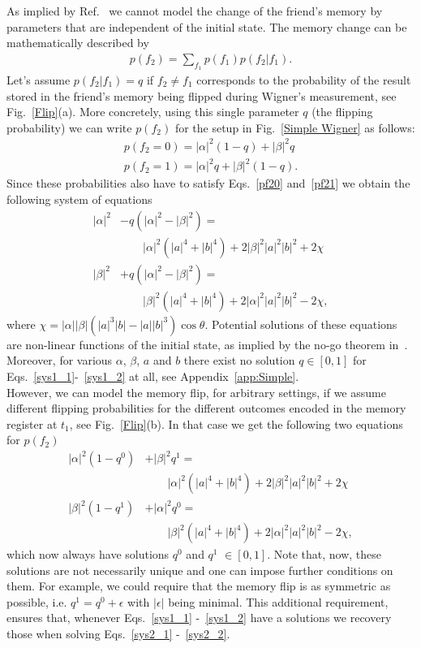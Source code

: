 \documentclass[a4paper,twocolumn,11pt,accepted=2017-05-09,dvipsnames]{quantumarticle}
\numberwithin{equation}{section}
\begin{document}
As implied by Ref.~\cite{allard2020no} we cannot model the change of the friend's memory by parameters that are independent of the initial state. The memory change can be mathematically described by
\begin{align}
\label{p2_0}
p(f_2)= \sum_{f_1}p(f_1)p(f_2|f_1).
\end{align}
Let's assume $p(f_2|f_1)=q$ if $f_2\neq f_1$ corresponds to the probability of the result stored in the friend's memory being flipped during Wigner's measurement, see Fig.~\ref{Flip}(a). More concretely, using this single parameter $q$ (the flipping probability) we can write $p(f_2)$ for the setup in Fig.~\ref{Simple Wigner} as follows:
\begin{align}
\label{p2_0}
p(f_2=0)= |\alpha |^2 (1-q)+|\beta |^2q \\
\label{p2_1}
p(f_2=1)=|\alpha |^2 q+|\beta |^2 (1-q).
\end{align}
Since these probabilities also have to satisfy Eqs.~\eqref{pf20} and~\eqref{pf21} we obtain the following system of equations
\begin{align}
\label{sys1_1}
|\alpha |^2 &-q(|\alpha |^2-|\beta |^2)=\\ 
& \qquad |\alpha|^2 (|a|^4+|b|^4)+2 |\beta|^2|a|^2|b|^2 +2\chi \nonumber \\
\label{sys1_2}
|\beta |^2 &+q(|\alpha |^2-|\beta |^2)= \\
& \qquad |\beta|^2 (|a|^4+|b|^4)+2 |\alpha|^2|a|^2|b|^2-2\chi, \nonumber
\end{align}
where $\chi=|\alpha| |\beta| (|a|^3|b| - |a||b|^3)\cos{\theta}$. Potential solutions of these equations are non-linear functions of the initial state, as implied by the no-go theorem in~\cite{allard2020no}. Moreover, for various $\alpha$, $\beta$, $a$ and $b$ there exist no solution $q\in [0,1]$ for  Eqs.~\eqref{sys1_1}-~\eqref{sys1_2} at all, see Appendix~\ref{app:Simple}. \\

However, we can model the memory flip, for arbitrary settings, if we assume different flipping probabilities for the different outcomes encoded in the memory register at $t_1$, see Fig.~\ref{Flip}(b). In that case we get the following two equations for $p(f_2)$
\begin{align}
\label{sys2_1}
|\alpha |^2 (1-q^0)&+|\beta |^2q^1=\\ 
& \qquad |\alpha|^2 (|a|^4+|b|^4)+2 |\beta|^2|a|^2|b|^2 +2\chi \nonumber \\
\label{sys2_2}
|\beta |^2 (1-q^1) &+|\alpha |^2q^0= \\
& \qquad |\beta|^2 (|a|^4+|b|^4)+2 |\alpha|^2|a|^2|b|^2-2\chi, \nonumber
\end{align}
which now always have solutions $q^0$ and $q^1$ $\in [0,1]$. Note that, now, these solutions are not necessarily unique and one can impose further conditions on them. For example, we could require that the memory flip is as symmetric as possible, i.e. $q^1=q^0+\epsilon$ with $|\epsilon|$ being minimal. This additional requirement, ensures that, whenever Eqs.~\eqref{sys1_1} -~\eqref{sys1_2} have a solutions we recovery those when solving Eqs.~\eqref{sys2_1} -~\eqref{sys2_2}. \\
\end{document}
